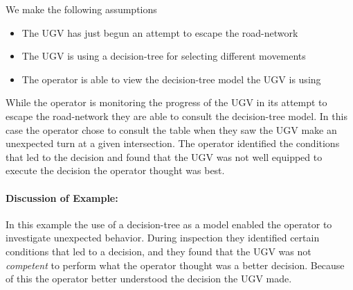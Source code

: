 We make the following assumptions

\begin{itemize}
    \item The UGV has just begun an attempt to escape the road-network
    \item The UGV is using a decision-tree for selecting different movements
    \item The operator is able to view the decision-tree model the UGV is using
\end{itemize}

While the operator is monitoring the progress of the UGV in its attempt to escape the road-network they are able to consult the decision-tree model. In this case the operator chose to consult the table when they saw the UGV make an unexpected turn at a given intersection. The operator identified the conditions that led to the decision and found that the UGV was not well equipped to execute the decision the operator thought was best.
\paragraph{\textbf{Discussion of Example:}} In this example the use of a decision-tree as a model enabled the operator to investigate unexpected behavior. During inspection they identified certain conditions that led to a decision, and they found that the UGV was not \emph{competent} to perform what the operator thought was a better decision. Because of this the operator better understood the decision the UGV made.
